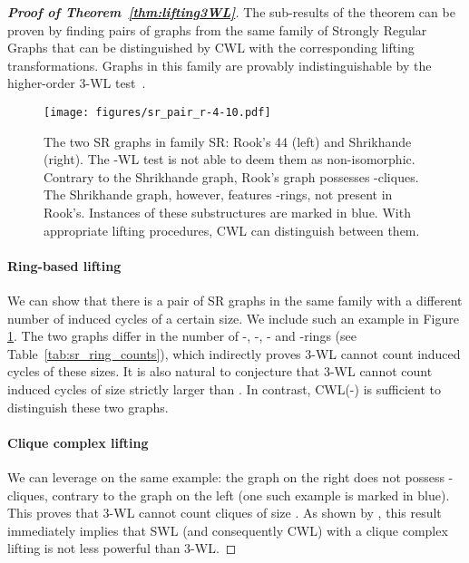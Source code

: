 \documentclass{article}
\begin{document}
\begin{proof}[\textbf{Proof of Theorem~\ref{thm:lifting3WL}}]
The sub-results of the theorem can be proven by finding pairs of graphs from the same family of Strongly Regular Graphs that can be distinguished by CWL with the corresponding lifting transformations. Graphs in this family are provably indistinguishable by the higher-order 3-WL test~\citep{bodnar2021weisfeiler}. 

\begin{figure}
    \centering
    \texttt{[image: figures/sr\_pair\_r-4-10.pdf]}
    \caption{The two SR graphs in family SR: Rook's 44 (left) and Shrikhande (right). The -WL test is not able to deem them as non-isomorphic. Contrary to the Shrikhande graph, Rook’s graph possesses -cliques. The Shrikhande graph, however, features -rings, not present in Rook’s. Instances of these substructures are marked in blue. With appropriate lifting procedures, CWL can distinguish between them.} 
    \label{fig:sr_pair}
\end{figure}

\paragraph{Ring-based lifting} We can show that there is a pair of SR graphs in the same family with a different number of induced cycles of a certain size. We include such an example in Figure \ref{fig:sr_pair}. The two graphs differ in the number of -, -, - and -rings (see Table~\ref{tab:sr_ring_counts}), which indirectly proves 3-WL cannot count induced cycles of these sizes. It is also natural to conjecture that 3-WL cannot count induced cycles of size strictly larger than . In contrast, CWL(-) is sufficient to distinguish these two graphs. 

\paragraph{Clique complex lifting} We can leverage on the same example: the graph on the right does not possess -cliques, contrary to the graph on the left (one such example is marked in blue). This proves that 3-WL cannot count cliques of size . As shown by \citet{bodnar2021weisfeiler}, this result immediately implies that SWL (and consequently CWL) with a clique complex lifting is not less powerful than 3-WL.


\end{proof}
\end{document}
